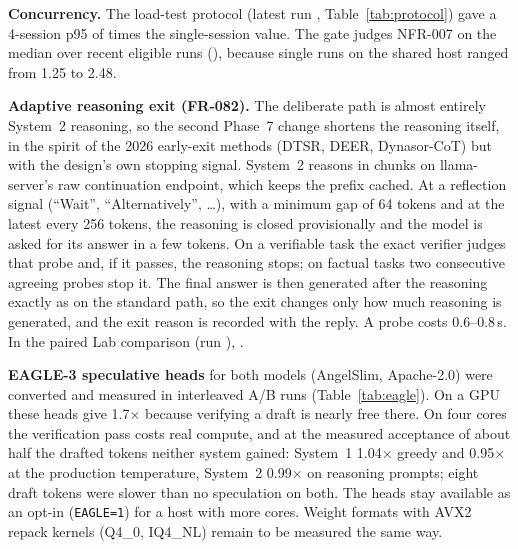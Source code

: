 \textbf{Concurrency.} The load-test protocol (latest run \ProtocolRun, Table~\ref{tab:protocol}) gave a 4-session
p95 of \NfrSevenRatio{} times the single-session value. The gate judges NFR-007 on the median over recent eligible
runs (\NfrSevenPooled), because single runs on the shared host ranged from 1.25 to 2.48.

\begin{table}[t]
\centering\caption{Load-test protocol, fast path (run \ProtocolRun)}\label{tab:protocol}
\ProtocolTable
\end{table}

\textbf{Adaptive reasoning exit (FR-082).} The deliberate path is almost entirely System~2 reasoning, so the
second Phase~7 change shortens the reasoning itself, in the spirit of the 2026 early-exit methods
(DTSR, DEER, Dynasor-CoT) but with the design's own stopping signal. System~2 reasons in chunks on
llama-server's raw continuation endpoint, which keeps the prefix cached. At a reflection signal (``Wait'',
``Alternatively'', \ldots), with a minimum gap of 64 tokens and at the latest every 256 tokens, the reasoning
is closed provisionally and the model is asked for its answer in a few tokens. On a verifiable task the exact
verifier judges that probe and, if it passes, the reasoning stops; on factual tasks two consecutive agreeing
probes stop it. The final answer is then generated after the reasoning exactly as on the standard path, so the
exit changes only how much reasoning is generated, and the exit reason is recorded with the reply. A probe
costs 0.6--0.8\,s. In the paired Lab comparison (run \AdaptiveExitRun), \AdaptiveExitSummary.

\textbf{EAGLE-3 speculative heads} \cite{li2024eagle} for both models (AngelSlim, Apache-2.0) were converted and
measured in interleaved A/B runs (Table~\ref{tab:eagle}). On a GPU these heads give 1.7$\times$ because
verifying a draft is nearly free there. On four cores the verification pass costs real compute, and at the
measured acceptance of about half the drafted tokens neither system gained: System~1 1.04$\times$ greedy and
0.95$\times$ at the production temperature, System~2 0.99$\times$ on reasoning prompts; eight draft tokens were
slower than no speculation on both. The heads stay available
as an opt-in (\texttt{EAGLE=1}) for a host with more cores. Weight formats with AVX2 repack kernels
(Q4\_0, IQ4\_NL) remain to be measured the same way.

\begin{table}[t]
\centering\caption{EAGLE-3 speculative decoding, interleaved A/B on the reference CPU}\label{tab:eagle}
\resizebox{\columnwidth}{!}{\EagleTable}
\end{table}

